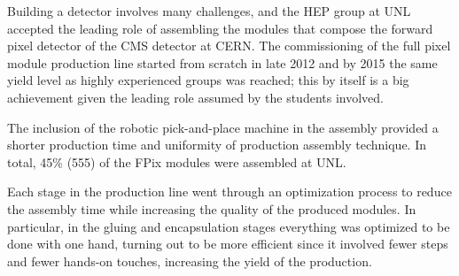 Building a detector involves many challenges, and the HEP group at UNL accepted the leading role of assembling the modules that compose the forward pixel detector of the CMS detector at CERN. The commissioning of the full pixel module production line started from scratch in late 2012 and by 2015 the same yield level as highly experienced groups was reached; this by itself is a big achievement given the leading role assumed by the students involved. %

The inclusion of the robotic pick-and-place machine in the assembly provided a shorter production time and uniformity of production assembly technique. In total, 45\% (555) of the FPix modules were assembled at UNL.  

Each stage in the production line went through an optimization process to reduce the assembly time while increasing the quality of the produced modules. In particular, in the gluing and encapsulation stages everything was optimized to be done with one hand, turning out to be more efficient since it involved fewer steps and fewer hands-on touches, increasing the yield of the production.

